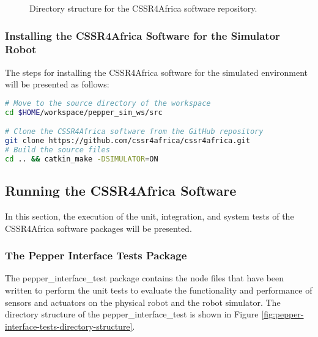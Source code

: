\documentclass{CSSRforAfrica}
\begin{document}
{\begin{figure}[H]
{\small 
{}
}

\caption{Directory structure for the CSSR4Africa software repository.}
\label{fig:pepper-robot-workspace-directory}
\end{figure}

\subsubsection{Installing the CSSR4Africa Software for the Simulator Robot}
\label{sim-soft}
The steps for installing the CSSR4Africa software for the simulated environment will be presented as follows:

\begin{lstlisting}[style=withoutNumbering, language=bash]
# Move to the source directory of the workspace
cd $HOME/workspace/pepper_sim_ws/src

# Clone the CSSR4Africa software from the GitHub repository
git clone https://github.com/cssr4africa/cssr4africa.git
# Build the source files
cd .. && catkin_make -DSIMULATOR=ON
\end{lstlisting}

\subsection{Running the CSSR4Africa Software}
In this section, the execution of the unit, integration, and system tests of the CSSR4Africa software packages will be presented.

\subsubsection{The Pepper Interface Tests Package}
The pepper\_interface\_test package contains the node files that have been written to perform the unit tests to evaluate the functionality and performance of sensors and actuators on the physical robot and the robot simulator. The directory structure of the pepper\_interface\_test is shown in Figure \ref{fig:pepper-interface-tests-directory-structure}.

}
\end{document}
